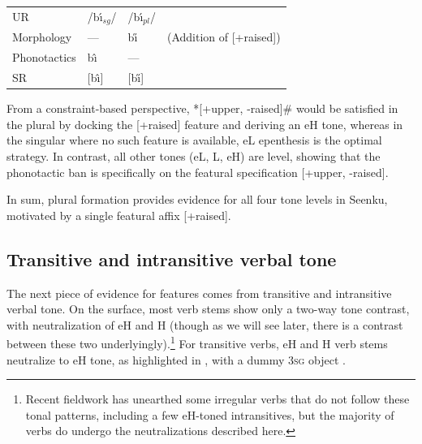 \documentclass[output=paper]{langsci/langscibook}
\begin{document}
\ea\label{ex:mcpherson:10} \begin{tabular}[t]{llll}
UR & /b\'{\i}$_{sg}$/ & /b\'{\i}$_{pl}$/ & \\
Morphology & --- & b\H{\i} & (Addition of [+raised]) \\
Phonotactics & b\^{\i} & --- & \\
SR & [b\^{\i}] & [b\H{\i}] \\
\end{tabular}
\z 

From a constraint-based perspective, *[+upper, -raised]\# would be satisfied in the plural by docking the [+raised] feature and deriving an eH tone, whereas in the singular where no such feature is available, eL epenthesis is the optimal strategy. In contrast, all other tones (eL, L, eH) are level, showing that the phonotactic ban is specifically on the featural specification [+upper, -raised]. 

In sum, plural formation provides evidence for all four tone levels in Seenku, motivated by a single featural affix [+raised].

\subsection{Transitive and intransitive verbal tone}\label{sec:mcpherson:SecTransitive}

The next piece of evidence for features comes from transitive and intransitive verbal tone. On the surface, most verb stems show only a two-way tone contrast, with neutralization of eH and H (though as we will see later, there is a contrast between these two underlyingly).\footnote{Recent fieldwork has unearthed some irregular verbs that do not follow these tonal patterns, including a few eH-toned intransitives, but the majority of verbs do undergo the neutralizations described here.} For transitive verbs, eH and H verb stems neutralize to eH tone, as highlighted in , with a dummy 3\textsc{sg} object {\it {}}.
\end{document}
